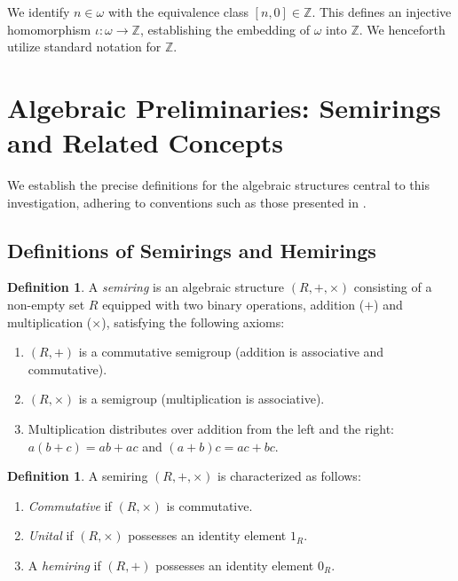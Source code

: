 \documentclass[11pt, a4paper]{article}
\theoremstyle{plain}
\theoremstyle{definition}
\newtheorem{definition}[theorem]{Definition}
\numberwithin{equation}{section}
\newcommand{\Z}{\mathbb{Z}}
\begin{document}
We identify $n \in \omega$ with the equivalence class $[n, 0] \in \Z$. This defines an injective homomorphism $\iota: \omega \to \Z$, establishing the embedding of $\omega$ into $\Z$. We henceforth utilize standard notation for $\Z$.

\section{Algebraic Preliminaries: Semirings and Related Concepts}

We establish the precise definitions for the algebraic structures central to this investigation, adhering to conventions such as those presented in \cite{GolanSemirings}.

\subsection{Definitions of Semirings and Hemirings}

\begin{definition}\label{def:semiring}
A \emph{semiring} is an algebraic structure $(R, +, \times)$ consisting of a non-empty set $R$ equipped with two binary operations, addition ($+$) and multiplication ($\times$), satisfying the following axioms:
\begin{enumerate}[label=(S\arabic*)]
    \item $(R, +)$ is a commutative semigroup (addition is associative and commutative).
    \item $(R, \times)$ is a semigroup (multiplication is associative).
    \item Multiplication distributes over addition from the left and the right: $a(b+c) = ab+ac$ and $(a+b)c = ac+bc$.
\end{enumerate}
\end{definition}

\begin{definition}\label{def:modifications_semiring}
A semiring $(R, +, \times)$ is characterized as follows:
\begin{enumerate}
    \item \emph{Commutative} if $(R, \times)$ is commutative.
    \item \emph{Unital} if $(R, \times)$ possesses an identity element $1_R$.
    \item A \emph{hemiring} if $(R, +)$ possesses an identity element $0_R$.
\end{enumerate}
\end{definition}
\end{document}

